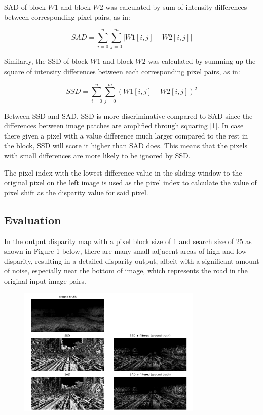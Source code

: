 \documentclass[conference]{IEEEtran}
\begin{document}
SAD of block $W1$ and block $W2$ was calculated by sum of intensity differences between corresponding pixel pairs, as in:

\begin{equation*}
    SAD=\sum^{n}_{i=0}\sum^{m}_{j=0}|W1[i,j]-W2[i,j]|
\end{equation*}

Similarly, the SSD of block $W1$ and block $W2$ was calculated by summing up the square of intensity differences between each corresponding pixel pairs, as in:

\begin{equation*}
    SSD=\sum^{n}_{i=0}\sum^{m}_{j=0}(W1[i,j]-W2[i,j])^2
\end{equation*}

Between SSD and SAD, SSD is more discriminative compared to SAD since the differences between image patches are amplified through squaring [1]. In case there given a pixel with a value difference much larger compared to the rest in the block, SSD will score it higher than SAD does. This means that the pixels with small differences are more likely to be ignored by SSD.

The pixel index with the lowest difference value in the sliding window to the original pixel on the left image is used as the pixel index to calculate the value of pixel shift as the disparity value for said pixel.
\
\subsection{Evaluation}

In the output disparity map with a pixel block size of 1 and search size of 25 as shown in Figure 1 below, there are many small adjacent areas of high and low disparity, resulting in a detailed disparity output, albeit with a significant amount of noise, especially near the bottom of image, which represents the road in the original input image pairs. 

\begin{figure}[H]
    \centering
    \includegraphics[width=8.8cm]{702_output_1_25.png}
\end{figure}
\end{document}
